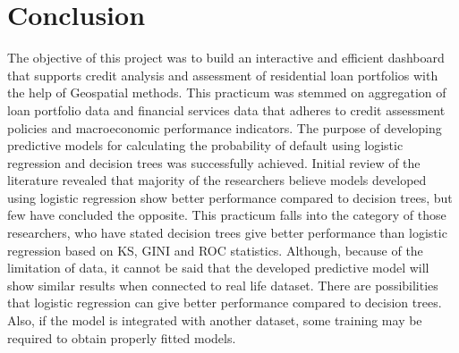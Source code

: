 \section{Conclusion}
The objective of this project was to build an interactive and efficient dashboard that supports credit analysis and assessment of residential loan portfolios with the help of Geospatial methods. This practicum was stemmed on aggregation of loan portfolio data and financial services data that adheres to credit assessment policies and macroeconomic performance indicators. The purpose of developing predictive models for calculating the probability of default using logistic regression and decision trees was successfully achieved.  Initial review of the literature revealed that majority of the researchers believe models developed using logistic regression show better performance compared to decision trees, but few have concluded the opposite. This practicum falls into the category of those researchers, who have stated decision trees give better performance than logistic regression based on KS, GINI and ROC statistics.  Although, because of the limitation of data, it cannot be said that the developed predictive model will show similar results when connected to real life dataset. There are possibilities that logistic regression can give better performance compared to decision trees. Also, if the model is integrated with another dataset, some training may be required to obtain properly fitted models. 

